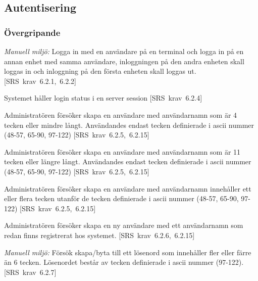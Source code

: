 \documentclass[a4paper]{article}
\def\reqinside{\hfil\penalty 100 \hfilneg \hbox}
\def \req [#1]{\reqinside{[SRS krav #1]}}
\begin{document}
\begin{appendices}






\subsection{Autentisering}
\subsubsection{Övergripande}

\begin{FT}
\item 
\emph{Manuell miljö:} Logga in med en användare på en terminal och logga in på en annan enhet med samma användare, inloggningen på den andra enheten skall loggas in och inloggning på den första enheten skall loggas ut.\req[6.2.1, 6.2.2]

\item
Systemet håller login status i en server session \req[6.2.4]

\item
Administratören försöker skapa en användare med användarnamn som är 4 tecken eller mindre långt. Användandes endast tecken definierade i ascii nummer (48-57, 65-90, 97-122)
\req[6.2.5, 6.2.15]

\item
Administratören försöker skapa en användare med användarnamn som är 11 tecken eller längre långt.
Användandes endast tecken definierade i ascii nummer (48-57, 65-90, 97-122)
\req[6.2.5, 6.2.15]

\item
Administratören försöker skapa en användare med användarnamn innehåller ett eller flera tecken utanför de tecken definierade i ascii nummer (48-57, 65-90, 97-122)
\req[6.2.5, 6.2.15]

\item
Administratören försöker skapa en ny användare med ett användarnamn som redan finns registrerat hos systemet.
\req[6.2.6, 6.2.15]

\item
\emph{Manuell miljö:} Försök skapa/byta till ett lösenord som innehåller fler eller färre än 6 tecken. Lösenordet består av tecken definierade i ascii nummer (97-122).
\req[6.2.7]


\end{FT}
\end{appendices}
\end{document}

